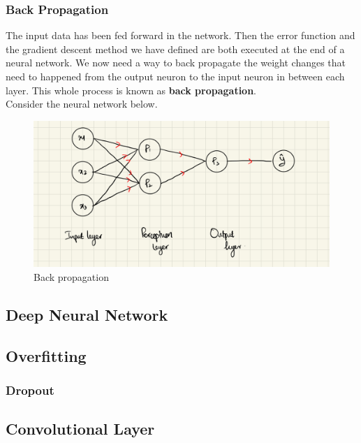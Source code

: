 \subsubsection{Back Propagation}
The input data has been fed forward in the network. Then the error function and the gradient descent method we have defined are both executed at the end of a neural network. We now need a way to back propagate the weight changes that need to happened from the output neuron to the input neuron in between each layer. This whole process is known as \textbf{back propagation}.\\
Consider the neural network below.
\begin{figure}[ht]
  \centering
  \includegraphics[scale=0.15]{CHAPTER_2/c2_fig_back_prog.jpeg}
  \caption{Back propagation}
  \label{}
\end{figure}\vspace{50mm}
\subsection{Deep Neural Network}
\subsection{Overfitting}
\subsubsection{Dropout}
\subsection{Convolutional Layer} 